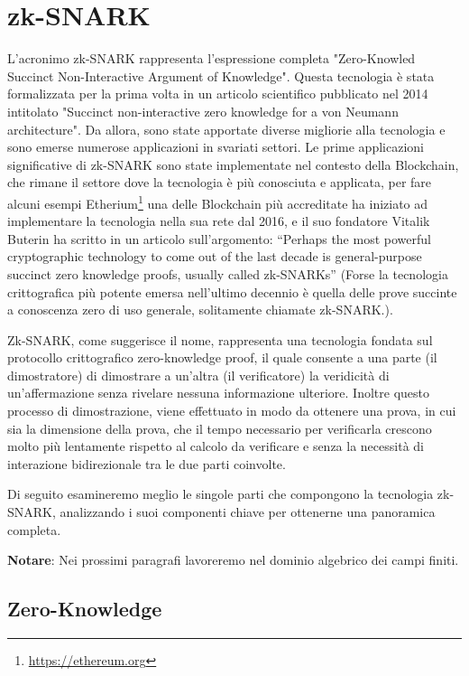 \section{zk-SNARK}

L'acronimo zk-SNARK rappresenta l'espressione completa "Zero-Knowled Succinct Non-Interactive Argument of Knowledge".
Questa tecnologia è stata formalizzata per la prima volta in un articolo scientifico pubblicato nel 2014 intitolato
"Succinct non-interactive zero knowledge for a von Neumann architecture"\cite{10.5555/2671225.2671275}. Da allora, sono state apportate diverse migliorie alla tecnologia
e sono emerse numerose applicazioni in svariati settori. Le prime applicazioni significative di zk-SNARK sono state
implementate nel contesto della Blockchain, che rimane il settore dove la tecnologia è più conosciuta e applicata, per
fare alcuni esempi Etherium\footnote{\url{https://ethereum.org}} una delle Blockchain più accreditate  ha iniziato ad implementare la tecnologia nella sua
rete dal 2016, e il suo fondatore Vitalik Buterin ha scritto in un articolo sull’argomento: “Perhaps the most powerful
cryptographic technology to come out of the last decade is general-purpose succinct zero knowledge proofs, usually
called zk-SNARKs” \cite{how-zk-snarks-are-possible} (Forse la tecnologia crittografica più potente emersa nell'ultimo decennio è quella delle prove
succinte a conoscenza zero di uso generale, solitamente chiamate zk-SNARK.).

Zk-SNARK, come suggerisce il nome, rappresenta una tecnologia fondata sul protocollo crittografico zero-knowledge proof,
il quale consente a una parte (il dimostratore) di dimostrare a un'altra (il verificatore) la veridicità di
un'affermazione senza rivelare nessuna informazione ulteriore. Inoltre questo processo di dimostrazione, viene
effettuato in modo da ottenere una prova, in cui sia la dimensione della prova, che il tempo necessario per verificarla
crescono molto più lentamente rispetto al calcolo da verificare e senza la necessità di interazione bidirezionale tra le
due parti coinvolte.

Di seguito esamineremo meglio le singole parti che compongono la tecnologia zk-SNARK, analizzando i suoi componenti
chiave per ottenerne una panoramica completa.

\textbf{Notare}: Nei prossimi paragrafi lavoreremo nel dominio algebrico dei campi finiti.

\subsection{Zero-Knowledge}

